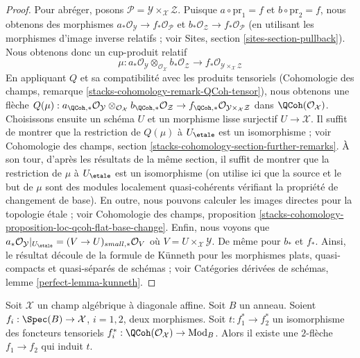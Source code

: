 \begin{proof}
Pour abréger, posons $\mathcal{P} = \mathcal{Y} \times_\mathcal{X} \mathcal{Z}$.
Puisque $a \circ \text{pr}_1 = f$ et $b \circ \text{pr}_2 = f$,
nous obtenons des morphismes $a_*\mathcal{O}_\mathcal{Y} \to f_*\mathcal{O}_\mathcal{P}$
et $b_*\mathcal{O}_\mathcal{Z} \to f_*\mathcal{O}_\mathcal{P}$ (en utilisant
les morphismes d'image inverse relatifs ; voir Sites, section \ref{sites-section-pullback}).
Nous obtenons donc un cup-produit relatif
$$
\mu :
a_*\mathcal{O}_\mathcal{Y}
\otimes_{\mathcal{O}_\mathcal{X}}
b_*\mathcal{O}_\mathcal{Z} \longrightarrow
f_*\mathcal{O}_{\mathcal{Y} \times_\mathcal{X} \mathcal{Z}}
$$
En appliquant $Q$ et sa compatibilité avec les produits tensoriels
(Cohomologie des champs, remarque \ref{stacks-cohomology-remark-QCoh-tensor}),
nous obtenons une flèche
$Q(\mu) : a_{\QCoh, *}\mathcal{O}_\mathcal{Y}
\otimes_{\mathcal{O}_\mathcal{X}}
b_{\QCoh, *}\mathcal{O}_\mathcal{Z} \to
f_{\QCoh, *}\mathcal{O}_{\mathcal{Y} \times_\mathcal{X} \mathcal{Z}}$
dans $\QCoh(\mathcal{O}_\mathcal{X})$.
Choisissons ensuite un schéma $U$ et un morphisme lisse surjectif
$U \to \mathcal{X}$. Il suffit de montrer que la restriction de
$Q(\mu)$ à $U_\etale$ est un isomorphisme ; voir
Cohomologie des champs, section \ref{stacks-cohomology-section-further-remarks}.
À son tour, d'après les résultats de la même section,
il suffit de montrer que la restriction de $\mu$ à $U_\etale$
est un isomorphisme (on utilise ici que la source et le but de $\mu$
sont des modules localement quasi-cohérents vérifiant la propriété de changement de base).
En outre, nous pouvons calculer les images directes pour la topologie \'etale ; voir
Cohomologie des champs, proposition
\ref{stacks-cohomology-proposition-loc-qcoh-flat-base-change}.
Enfin, nous voyons que
$a_*\mathcal{O}_\mathcal{Y}|_{U_\etale} = (V \to U)_{small, *}\mathcal{O}_V$
où $V = U \times_\mathcal{X} \mathcal{Y}$.
De même pour $b_*$ et $f_*$. Ainsi, le résultat découle
de la formule de K\"unneth pour les morphismes plats, quasi-compacts et quasi-séparés
de schémas ; voir Catégories dérivées de schémas,
lemme \ref{perfect-lemma-kunneth}.
\end{proof}

\begin{lemma}
\label{lemma-fully-faithful}
Soit $\mathcal{X}$ un champ algébrique à diagonale affine.
Soit $B$ un anneau. Soient $f_i : \Spec(B) \to \mathcal{X}$, $i = 1, 2$,
deux morphismes. Soit $t : f_1^* \to f_2^*$ un isomorphisme
des foncteurs tensoriels
$f_i^* : \QCoh(\mathcal{O}_\mathcal{X}) \to \text{Mod}_B$.
Alors il existe une $2$-flèche $f_1 \to f_2$ qui induit $t$.
\end{lemma}

